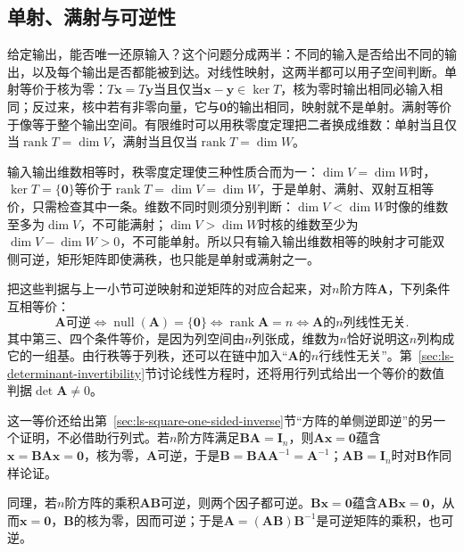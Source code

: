 \subsection{单射、满射与可逆性}
\label{sec:ls-injective-surjective-invertible}
给定输出，能否唯一还原输入？这个问题分成两半：不同的输入是否给出不同的输出，以及每个输出是否都能被到达。对线性映射，这两半都可以用子空间判断。单射等价于核为零：$T\bm x=T\bm y$当且仅当$\bm x-\bm y\in\ker T$，核为零时输出相同必输入相同；反过来，核中若有非零向量，它与$\bm0$的输出相同，映射就不是单射。满射等价于像等于整个输出空间。有限维时可以用秩零度定理把二者换成维数：单射当且仅当$\operatorname{rank}T=\dim V$，满射当且仅当$\operatorname{rank}T=\dim W$。

输入输出维数相等时，秩零度定理使三种性质合而为一：$\dim V=\dim W$时，$\ker T=\{\bm0\}$等价于$\operatorname{rank}T=\dim V=\dim W$，于是单射、满射、双射互相等价，只需检查其中一条。维数不同时则须分别判断：$\dim V<\dim W$时像的维数至多为$\dim V$，不可能满射；$\dim V>\dim W$时核的维数至少为$\dim V-\dim W>0$，不可能单射。所以只有输入输出维数相等的映射才可能双侧可逆，矩形矩阵即使满秩，也只能是单射或满射之一。

把这些判据与上一小节可逆映射和逆矩阵的对应合起来，对$n$阶方阵$\bm A$，下列条件互相等价：
\[
 \bm A\text{可逆}
 \iff\operatorname{null}(\bm A)=\{\bm0\}
 \iff\operatorname{rank}\bm A=n
 \iff\bm A\text{的}n\text{列线性无关}.
\]
其中第三、四个条件等价，是因为列空间由$n$列张成，维数为$n$恰好说明这$n$列构成它的一组基。由行秩等于列秩，还可以在链中加入“$\bm A$的$n$行线性无关”。第~\ref{sec:ls-determinant-invertibility}节讨论线性方程时，还将用行列式给出一个等价的数值判据$\det\bm A\neq0$。

这一等价还给出第~\ref{sec:ls-square-one-sided-inverse}节“方阵的单侧逆即逆”的另一个证明，不必借助行列式。若$n$阶方阵满足$\bm B\bm A=\bm I_n$，则$\bm A\bm x=\bm0$蕴含$\bm x=\bm B\bm A\bm x=\bm0$，核为零，$\bm A$可逆，于是$\bm B=\bm B\bm A\bm A^{-1}=\bm A^{-1}$；$\bm A\bm B=\bm I_n$时对$\bm B$作同样论证。

同理，若$n$阶方阵的乘积$\bm A\bm B$可逆，则两个因子都可逆。$\bm B\bm x=\bm0$蕴含$\bm A\bm B\bm x=\bm0$，从而$\bm x=\bm0$，$\bm B$的核为零，因而可逆；于是$\bm A=(\bm A\bm B)\bm B^{-1}$是可逆矩阵的乘积，也可逆。

